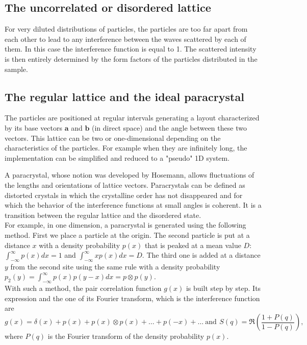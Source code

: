 \subsection{The uncorrelated or disordered lattice}
For very diluted distributions of particles, the particles are too far apart from each other to lead to any interference between the waves scattered by each of them. In this case the interference function is equal to 1. The scattered intensity is then entirely determined by the form factors of the particles distributed in the sample.

\subsection{The regular lattice and the ideal paracrystal}
The particles are positioned at regular intervals generating a layout characterized by its base vectors $\mathbf{a}$ and $\mathbf{b}$ (in direct space) and the angle between these two vectors.
This lattice can be two or one-dimensional depending on the characteristics of the particles. For example when they are infinitely long, the implementation can be simplified and reduced to a "pseudo" 1D system.

A paracrystal, whose notion was developed by Hosemann\cite{Hos51}, allows fluctuations of the lengths and orientations of lattice vectors. Paracrystals can be defined as distorted crystals in which the crystalline order has not disappeared and for which the behavior of the interference functions  at small angles is coherent.
It is a transition between the regular lattice and the disordered state.\\

For example, in one dimension, a paracrystal is generated using the following method. First we place a particle at the origin. The second particle is put at a distance $x$ with a density probability $p(x)$ that is peaked at a mean value $D$: $\int_{-\infty} ^{\infty}p(x)dx=1$ and $\int_{-\infty}^{\infty}xp(x)dx=D$. The third one is added at a distance $y$ from the second site using the same rule with a density probability $p_2(y)= \int_{-\infty}^{\infty}p(x)p(y-x)dx=p\otimes p(y)$.\\ With such a method, the pair correlation function $g(x)$ is built step by step. Its expression and the one of its Fourier transform, which is the interference function are
\begin{equation*}
g(x)=\delta(x)+ p(x)+ p(x)\otimes p(x)+\ldots + p(-x)+\ldots \: \mathrm{and}\:\, S(q)=\Re\left(\dfrac{1+P(q)}{1-P(q)}\right),
\end{equation*}
 where $P(q)$ is the Fourier transform of the density probability $p(x)$.\\

